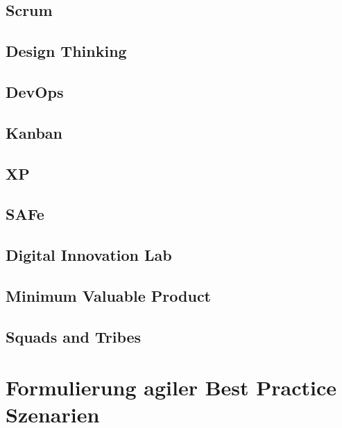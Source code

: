 \todots

\subsection{Scrum}

\todots

\subsection{Design Thinking}

\todots

\subsection{DevOps}

\todots

\subsection{Kanban}

\todots

\subsection{XP}

\todots

\subsection{SAFe}

\todots

\subsection{Digital Innovation Lab}

\todots

\subsection{Minimum Valuable Product}

\todots

\subsection{Squads and Tribes}

\todots


\section{Formulierung agiler Best Practice Szenarien}


\todots


